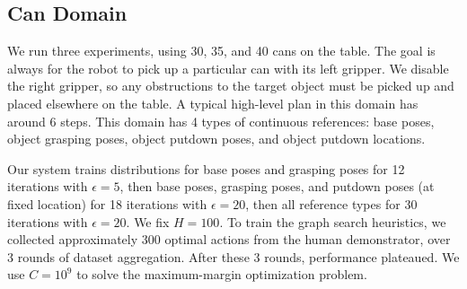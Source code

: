 
\subsection{Can Domain}
\addtolength{\textheight}{-3cm}
We run three experiments, using 30, 35, and 40 cans on the
table.  The goal is always for the robot to pick up a particular can
with its left gripper. We disable the right gripper, so any
obstructions to the target object must be picked up and placed
elsewhere on the table. A typical high-level plan in this domain has around 6 steps.
This domain has 4 types of continuous
references: base poses, object grasping poses, object putdown poses,
and object putdown locations.

Our system trains distributions for base poses and
grasping poses for 12 iterations with $\epsilon = 5$, then base poses,
grasping poses, and putdown poses (at fixed location) for 18
iterations with $\epsilon = 20$, then all reference types for 30
iterations with $\epsilon = 20$. We fix $H = 100$.
To train the graph search heuristics, we collected approximately 300
optimal actions from the human demonstrator, over 3 rounds of dataset aggregation.
After these 3 rounds, performance plateaued. We use $C =
10^{9}$ to solve the maximum-margin optimization problem.

